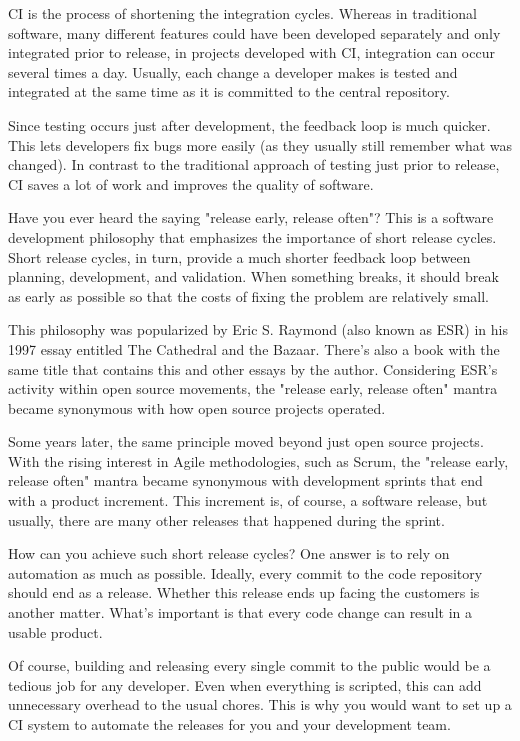 CI is the process of shortening the integration cycles. Whereas in traditional software, many different features could have been developed separately and only integrated prior to release, in projects developed with CI, integration can occur several times a day. Usually, each change a developer makes is tested and integrated at the same time as it is committed to the central repository.

Since testing occurs just after development, the feedback loop is much quicker. This lets developers fix bugs more easily (as they usually still remember what was changed). In contrast to the traditional approach of testing just prior to release, CI saves a lot of work and improves the quality of software.


Have you ever heard the saying "release early, release often"? This is a software development philosophy that emphasizes the importance of short release cycles. Short release cycles, in turn, provide a much shorter feedback loop between planning, development, and validation. When something breaks, it should break as early as possible so that the costs of fixing the problem are relatively small.

This philosophy was popularized by Eric S. Raymond (also known as ESR) in his 1997 essay entitled The Cathedral and the Bazaar. There's also a book with the same title that contains this and other essays by the author. Considering ESR's activity within open source movements, the "release early, release often" mantra became synonymous with how open source projects operated.

Some years later, the same principle moved beyond just open source projects. With the rising interest in Agile methodologies, such as Scrum, the "release early, release often" mantra became synonymous with development sprints that end with a product increment. This increment is, of course, a software release, but usually, there are many other releases that happened during the sprint. 

How can you achieve such short release cycles? One answer is to rely on automation as much as possible. Ideally, every commit to the code repository should end as a release. Whether this release ends up facing the customers is another matter. What's important is that every code change can result in a usable product.

Of course, building and releasing every single commit to the public would be a tedious job for any developer. Even when everything is scripted, this can add unnecessary overhead to the usual chores. This is why you would want to set up a CI system to automate the releases for you and your development team.

